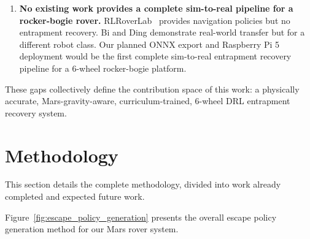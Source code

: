 \documentclass[12pt,a4paper]{article}
\begin{document}
\begin{enumerate}
    \item \textbf{No existing work provides a complete sim-to-real pipeline for a rocker-bogie rover.}
    RLRoverLab~\cite{rlroverlab} provides navigation policies but no entrapment recovery. Bi and Ding demonstrate real-world transfer but for a different robot class. Our planned ONNX export and Raspberry Pi 5 deployment would be the first complete sim-to-real entrapment recovery pipeline for a 6-wheel rocker-bogie platform.

\end{enumerate}

These gaps collectively define the contribution space of this work: a physically accurate, Mars-gravity-aware, curriculum-trained, 6-wheel DRL entrapment recovery system.

\newpage
\section{Methodology}

This section details the complete methodology, divided into work already completed and expected future work.


Figure~\ref{fig:escape_policy_generation} presents the overall escape policy generation method for our Mars rover system.

\end{document}
